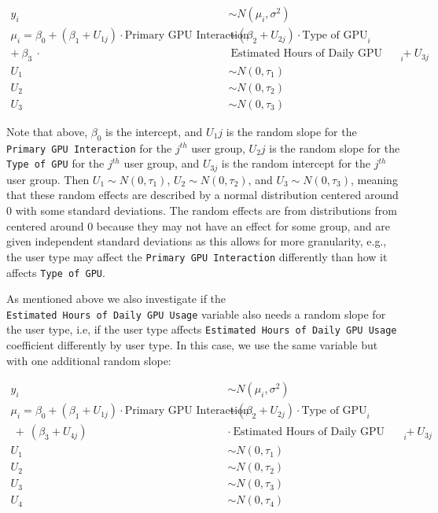 \documentclass[
]{article}
\begin{document}
\[
\begin{aligned}
y_i &\sim N(\mu_i, \sigma^2) \\
\mu_i = \beta_0 + (\beta_1 + U_{1j})\cdot\text{Primary GPU Interaction}& + (\beta_2 + U_{2j})\cdot\text{Type of GPU}_i \\+~ \beta_3~ \cdot &~\text{Estimated Hours of Daily GPU Usage}_i + U_{3j} \\
U_{1} &\sim N(0, \tau_1) \\
U_2 &\sim N(0, \tau_2) \\
U_{3} &\sim N(0, \tau_{3})
\end{aligned}
\]

Note that above, \(\beta_0\) is the intercept, and \(U_1j\) is the
random slope for the \texttt{Primary\ GPU\ Interaction} for the
\(j^{th}\) user group, \(U_2j\) is the random slope for the
\texttt{Type\ of\ GPU} for the \(j^{th}\) user group, and \(U_{3j}\) is
the random intercept for the \(j^{th}\) user group. Then
\(U_1 \sim N(0, \tau_1)\), \(U_2 \sim N(0, \tau_2)\), and
\(U_3 \sim N(0, \tau_3)\), meaning that these random effects are
described by a normal distribution centered around 0 with some standard
deviations. The random effects are from distributions from centered
around 0 because they may not have an effect for some group, and are
given independent standard deviations as this allows for more
granularity, e.g., the user type may affect the
\texttt{Primary\ GPU\ Interaction} differently than how it affects
\texttt{Type\ of\ GPU}.

As mentioned above we also investigate if the
\texttt{Estimated\ Hours\ of\ Daily\ GPU\ Usage} variable also needs a
random slope for the user type, i.e, if the user type affects
\texttt{Estimated\ Hours\ of\ Daily\ GPU\ Usage} coefficient differently
by user type. In this case, we use the same variable but with one
additional random slope:

\[
\begin{aligned}
y_i &\sim N(\mu_i, \sigma^2) \\
\mu_i = \beta_0 + (\beta_1 + U_{1j})\cdot \text{Primary GPU Interaction} &+ (\beta_2 + U_{2j})\cdot\text{Type of GPU}_i \\~+ ~(\beta_3 + U_{4j}) ~ &\cdot ~\text{Estimated Hours of Daily GPU Usage}_i + U_{3j} \\
U_{1} &\sim N(0, \tau_1) \\
U_2 &\sim N(0, \tau_2) \\
U_{3} &\sim N(0, \tau_{3}) \\
U_{4} &\sim N(0, \tau_{4})
\end{aligned}
\]
\end{document}
